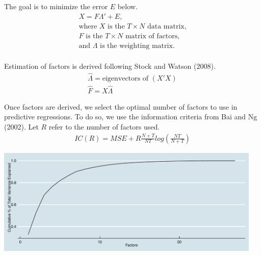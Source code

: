 \documentclass[11pt, letterpaper]{article}\usepackage[]{graphicx}\usepackage[]{color}
\begin{document}
The goal is to minimize the error $E$ below.
\begin{align*}
	X = F  \Lambda ' + E,\\
	\text{where $X$ is the $T \times N$ data matrix,}\\
	\text{$F$ is the $T \times N$ matrix of factors,}\\
	\text{and $\Lambda$ is the weighting matrix.}\\
\end{align*}

Estimation of factors is derived following Stock and Watson (2008).
\begin{align*}
	\widehat{\Lambda} = \text{eigenvectors of } (X'X)\\
	\widehat{F} = X \widehat{\Lambda}
\end{align*}

Once factors are derived, we select the optimal number of factors to use in predictive regressions. To do so, we use the information criteria from Bai and Ng (2002). Let $R$ refer to the number of factors used.
\begin{align*}
	IC(R) = MSE + R \frac{N+T}{NT} log\left(\frac{NT}{N+T}\right)
\end{align*}



{\centering \includegraphics[width=5in,height=2in]{figure/unnamed-chunk-4-1} 

}
\end{document}
